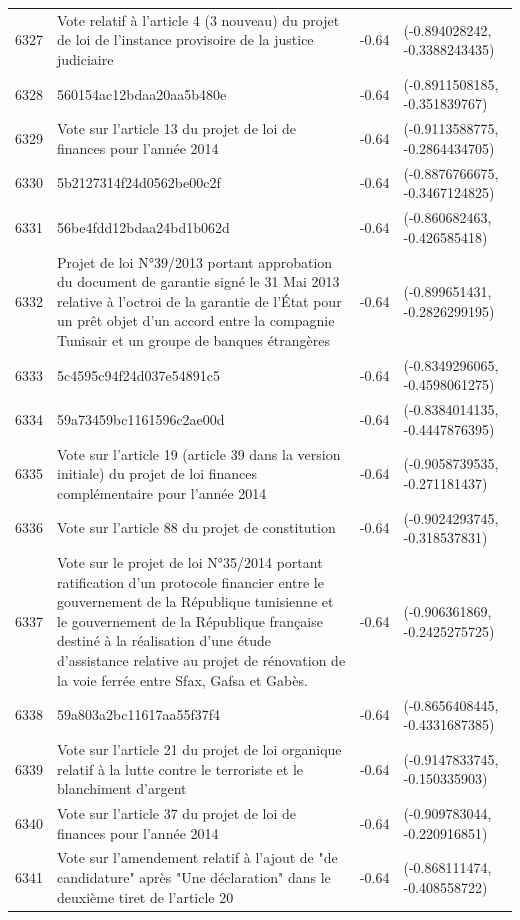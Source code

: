\begin{table}[ht]
\begin{tabular}{rlrl}
  6327 & Vote relatif à l'article 4 (3 nouveau) du projet de loi de l'instance provisoire de la justice judiciaire & -0.64 & (-0.894028242, -0.3388243435) \\ 
  6328 & 560154ac12bdaa20aa5b480e & -0.64 & (-0.8911508185, -0.351839767) \\ 
  6329 & Vote sur l'article 13 du projet de loi de finances pour l'année 2014 & -0.64 & (-0.9113588775, -0.2864434705) \\ 
  6330 & 5b2127314f24d0562be00c2f & -0.64 & (-0.8876766675, -0.3467124825) \\ 
  6331 & 56be4fdd12bdaa24bd1b062d & -0.64 & (-0.860682463, -0.426585418) \\ 
  6332 & Projet de loi N°39/2013 portant approbation du document de garantie signé le 31 Mai 2013 relative à l'octroi de la garantie de l'État pour un prêt objet d'un accord entre la compagnie Tunisair et un groupe de banques étrangères & -0.64 & (-0.899651431, -0.2826299195) \\ 
  6333 & 5c4595c94f24d037e54891c5 & -0.64 & (-0.8349296065, -0.4598061275) \\ 
  6334 & 59a73459bc1161596c2ae00d & -0.64 & (-0.8384014135, -0.4447876395) \\ 
  6335 & Vote sur l'article 19 (article 39 dans la version initiale) du projet de loi finances complémentaire pour l'année 2014 & -0.64 & (-0.9058739535, -0.271181437) \\ 
  6336 & Vote sur l'article 88 du projet de constitution & -0.64 & (-0.9024293745, -0.318537831) \\ 
  6337 & Vote sur le projet de loi N°35/2014 portant ratification d'un protocole financier entre le gouvernement de la République tunisienne et le gouvernement de la République française destiné à la réalisation d'une étude d'assistance relative au projet de rénovation de la voie ferrée entre Sfax, Gafsa et Gabès. & -0.64 & (-0.906361869, -0.2425275725) \\ 
  6338 & 59a803a2bc11617aa55f37f4 & -0.64 & (-0.8656408445, -0.4331687385) \\ 
  6339 & Vote sur l'article 21 du projet de loi organique relatif à la lutte contre le terroriste et le blanchiment d'argent & -0.64 & (-0.9147833745, -0.150335903) \\ 
  6340 & Vote sur l'article 37 du projet de loi de finances pour l'année 2014 & -0.64 & (-0.909783044, -0.220916851) \\ 
  6341 & Vote sur l'amendement relatif à l'ajout de "de candidature" après "Une déclaration" dans le deuxième tiret de l'article 20 & -0.64 & (-0.868111474, -0.408558722) \\ 

\end{tabular}
\end{table}
